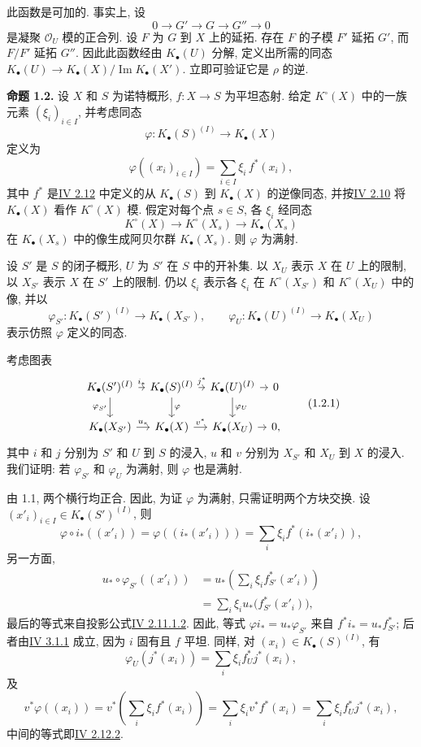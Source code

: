 此函数是可加的. 事实上, 设
\[
0\longrightarrow G'\longrightarrow G\longrightarrow G''\longrightarrow 0
\]
是凝聚 $\mathcal O_U$ 模的正合列. 设 $F$ 为 $G$ 到 $X$ 上的延拓. 存在 $F$ 的子模 $F'$ 延拓 $G'$, 而 $F/F'$ 延拓 $G''$. 因此此函数经由 $K_\bullet(U)$ 分解, 定义出所需的同态 $K_\bullet(U)\to K_\bullet(X)/\operatorname{Im}K_\bullet(X')$. 立即可验证它是 $\rho$ 的逆.

\textbf{命题 1.2.} 设 $X$ 和 $S$ 为诺特概形, $f:X\to S$ 为平坦态射. 给定 $K^\circ(X)$ 中的一族元素 $(\xi_i)_{i\in I}$, 并考虑同态
\[
 \varphi:K_\bullet(S)^{(I)}\longrightarrow K_\bullet(X)
\]
定义为
\[
 \varphi((x_i)_{i\in I})=\sum_{i\in I}\xi_i\,f^*(x_i),
\]
其中 $f^*$ 是\hyperlink{sga6.e04.para.2-12}{IV 2.12} 中定义的从 $K_\bullet(S)$ 到 $K_\bullet(X)$ 的逆像同态, 并按\hyperlink{sga6.e04.para.2-10}{IV 2.10} 将 $K_\bullet(X)$ 看作 $K^\circ(X)$ 模. 假定对每个点 $s\in S$, 各 $\xi_i$ 经同态
\[
 K^\circ(X)\longrightarrow K^\circ(X_s)\longrightarrow K_\bullet(X_s)
\]
在 $K_\bullet(X_s)$ 中的像生成阿贝尔群 $K_\bullet(X_s)$. 则 $\varphi$ 为满射.

设 $S'$ 是 $S$ 的闭子概形, $U$ 为 $S'$ 在 $S$ 中的开补集. 以 $X_U$ 表示 $X$ 在 $U$ 上的限制, 以 $X_{S'}$ 表示 $X$ 在 $S'$ 上的限制. 仍以 $\xi_i$ 表示各 $\xi_i$ 在 $K^\circ(X_{S'})$ 和 $K^\circ(X_U)$ 中的像, 并以
\[
 \varphi_{S'}:K_\bullet(S')^{(I)}\to K_\bullet(X_{S'}),\qquad
 \varphi_U:K_\bullet(U)^{(I)}\to K_\bullet(X_U)
\]
表示仿照 $\varphi$ 定义的同态.

考虑图表
\[
\begin{tikzcd}[column sep=tiny]
K_\bullet(S')^{(I)} \arrow[r,"i_*"] \arrow[d,"\varphi_{S'}"'] &
K_\bullet(S)^{(I)} \arrow[r,"j^*"] \arrow[d,"\varphi"] &
K_\bullet(U)^{(I)} \arrow[r] \arrow[d,"\varphi_U"] & 0\\
K_\bullet(X_{S'}) \arrow[r,"u_*"] & K_\bullet(X) \arrow[r,"v^*"] & K_\bullet(X_U) \arrow[r] & 0,
\end{tikzcd}\tag{1.2.1}
\]
其中 $i$ 和 $j$ 分别为 $S'$ 和 $U$ 到 $S$ 的浸入, $u$ 和 $v$ 分别为 $X_{S'}$ 和 $X_U$ 到 $X$ 的浸入. 我们证明: 若 $\varphi_{S'}$ 和 $\varphi_U$ 为满射, 则 $\varphi$ 也是满射.

由 1.1, 两个横行均正合. 因此, 为证 $\varphi$ 为满射, 只需证明两个方块交换. 设 $(x'_i)_{i\in I}\in K_\bullet(S')^{(I)}$, 则
\[
 \varphi\circ i_*((x'_i))=\varphi((i_*(x'_i)))=\sum_i \xi_i f^*(i_*(x'_i)),
\]
另一方面,
\[
\begin{aligned}
 u_*\circ\varphi_{S'}((x'_i))
 &=u_*\left(\sum_i\xi_i f_{S'}^*(x'_i)\right)\\
 &=\sum_i \xi_i u_*\bigl(f_{S'}^*(x'_i)\bigr),
\end{aligned}
\]
最后的等式来自投影公式\hyperlink{sga6.e04.eq.2-11-1-2}{IV 2.11.1.2}. 因此, 等式 $\varphi i_*=u_*\varphi_{S'}$ 来自 $f^*i_*=u_*f_{S'}^*$; 后者由\hyperlink{sga6.e04.prop.3-1-1}{IV 3.1.1} 成立, 因为 $i$ 固有且 $f$ 平坦. 同样, 对 $(x_i)\in K_\bullet(S)^{(I)}$, 有
\[
 \varphi_U(j^*(x_i))=\sum_i\xi_i f_U^*j^*(x_i),
\]
及
\[
 v^*\varphi((x_i))=v^*\left(\sum_i\xi_i f^*(x_i)\right)=\sum_i\xi_i v^*f^*(x_i)=\sum_i\xi_i f_U^*j^*(x_i),
\]
中间的等式即\hyperlink{sga6.e04.eq.2-12-2}{IV 2.12.2}.

